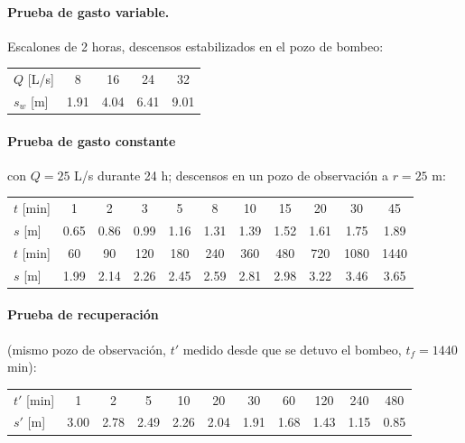 \documentclass[11pt,letterpaper]{article}
\begin{document}
\paragraph{Prueba de gasto variable.} Escalones de 2 horas, descensos estabilizados en el pozo de bombeo:
\begin{center}
\begin{tabular}{lcccc}
\toprule
$Q$ [L/s] & 8 & 16 & 24 & 32\\
$s_w$ [m] & 1.91 & 4.04 & 6.41 & 9.01\\
\bottomrule
\end{tabular}
\end{center}

\paragraph{Prueba de gasto constante} con $Q=25$ L/s durante 24 h; descensos en un pozo de observación a $r=25$ m:
\begin{center}\small
\begin{tabular}{lcccccccccc}
\toprule
$t$ [min] & 1 & 2 & 3 & 5 & 8 & 10 & 15 & 20 & 30 & 45\\
$s$ [m] & 0.65 & 0.86 & 0.99 & 1.16 & 1.31 & 1.39 & 1.52 & 1.61 & 1.75 & 1.89\\
\midrule
$t$ [min] & 60 & 90 & 120 & 180 & 240 & 360 & 480 & 720 & 1080 & 1440\\
$s$ [m] & 1.99 & 2.14 & 2.26 & 2.45 & 2.59 & 2.81 & 2.98 & 3.22 & 3.46 & 3.65\\
\bottomrule
\end{tabular}
\end{center}

\paragraph{Prueba de recuperación} (mismo pozo de observación, $t'$ medido desde que se detuvo el bombeo, $t_f=1440$ min):
\begin{center}\small
\begin{tabular}{lcccccccccc}
\toprule
$t'$ [min] & 1 & 2 & 5 & 10 & 20 & 30 & 60 & 120 & 240 & 480\\
$s'$ [m] & 3.00 & 2.78 & 2.49 & 2.26 & 2.04 & 1.91 & 1.68 & 1.43 & 1.15 & 0.85\\
\bottomrule
\end{tabular}
\end{center}
\end{document}
